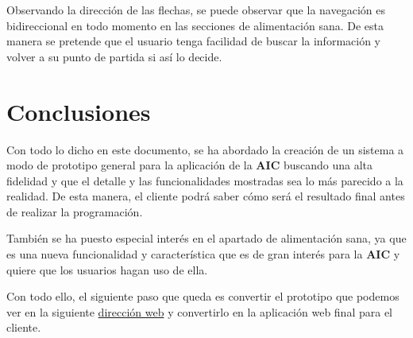 \documentclass{\ClassPath/viu-tfm-template}
\begin{document}
Observando la dirección de las flechas, se puede observar que la navegación es bidireccional en todo momento en las secciones de alimentación sana. De esta manera se pretende que el usuario tenga facilidad de buscar la información y volver a su punto de partida si así lo decide.


\chapter{Conclusiones}

Con todo lo dicho en este documento, se ha abordado la creación de un sistema a modo de prototipo general para la aplicación de la \textbf{AIC} buscando una alta fidelidad y que el detalle y las funcionalidades mostradas sea lo más parecido a la realidad. De esta manera, el cliente podrá saber cómo será el resultado final antes de realizar la programación.

También se ha puesto especial interés en el apartado de alimentación sana, ya que es una nueva funcionalidad y característica que es de gran interés para la \textbf{AIC} y quiere que los usuarios hagan uso de ella.

Con todo ello, el siguiente paso que queda es convertir el prototipo que podemos ver en la siguiente \href{https://yuki.github.io/VIU_03MASW/preview.html}{dirección web} y convertirlo en la aplicación web final para el cliente.


\end{document}
